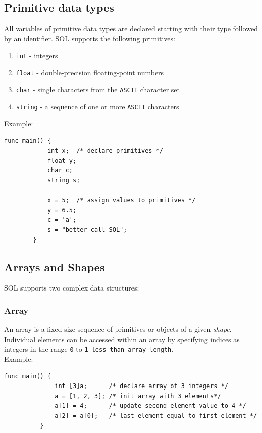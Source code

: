 \documentclass[letterpaper,12pt]{report}
\begin{document}
    \subsection{Primitive data types}
      All variables of primitive data types are declared starting with their type followed by an identifier. SOL supports the following primitives:
      \begin{enumerate}
        \itemsep 0em
        \item \texttt{int} - integers
        \item \texttt{float} - double-precision floating-point numbers
        \item \texttt{char} - single characters from the \texttt{ASCII} character set
        \item \texttt{string} - a sequence of one or more \texttt{ASCII} characters
      \end{enumerate}
      Example:\\
      \begin{lstlisting}[style=sol]
        func main() {
            int x;  /* declare primitives */
            float y;
            char c;
            string s;

            x = 5;  /* assign values to primitives */
            y = 6.5;
            c = 'a';
            s = "better call SOL";
        }
      \end{lstlisting}

    \subsection{Arrays and Shapes}
      SOL supports two complex data structures:
      \subsubsection{Array}
        An array is a fixed-size sequence of primitives or objects of a given \textit{shape}. Individual elements can be accessed within an array by specifying indices as integers in the range \texttt{0} to \texttt{1 less than array length}.\\
        Example:\\
        \begin{lstlisting}[style=sol]
          func main() {
              int [3]a;      /* declare array of 3 integers */
              a = [1, 2, 3]; /* init array with 3 elements*/
              a[1] = 4;      /* update second element value to 4 */
              a[2] = a[0];   /* last element equal to first element */
          }
        \end{lstlisting}
\end{document}

